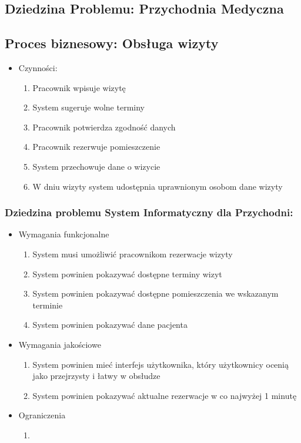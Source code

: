\documentclass{article}
\begin{document}
\subsection*{Dziedzina Problemu: Przychodnia Medyczna}
\subsection*{Proces biznesowy: Obsługa wizyty}
\begin{itemize}
\item Czynności:
\begin{enumerate}
\item Pracownik wpisuje wizytę
\item System sugeruje wolne terminy
\item Pracownik potwierdza zgodność danych
\item Pracownik rezerwuje pomieszczenie
\item System przechowuje dane o wizycie
\item W dniu wizyty system udostępnia uprawnionym osobom dane wizyty
\end{enumerate}
\end{itemize}
\subsubsection*{Dziedzina problemu System Informatyczny dla Przychodni:}
\begin{itemize}
	\item Wymagania funkcjonalne
		\begin{enumerate}
			\item System musi umożliwić pracownikom rezerwacje wizyty
			\item System powinien pokazywać dostępne terminy wizyt
			\item System powinien pokazywać dostępne pomieszczenia we wskazanym terminie
			\item System powinien pokazywać dane pacjenta
		\end{enumerate}
	\item Wymagania jakościowe
		\begin{enumerate}
			\item System powinien mieć interfejs użytkownika, który użytkownicy ocenią jako przejrzysty i łatwy w obsłudze
			\item System powinien pokazywać aktualne rezerwacje w co najwyżej 1 minutę
		\end{enumerate}
	\item Ograniczenia
		\begin{enumerate}
			\item
		\end{enumerate}
\end{itemize}
\end{document}
